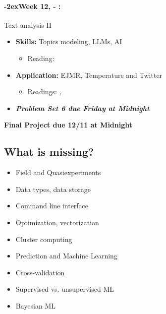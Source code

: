 \documentclass[11pt]{article}
\newcommand{\week}[1]{%
  \paragraph*{\kern-2ex\quad #1, \AdvanceDate[1]\syldate{\today} - \AdvanceDate[2]\syldate{\today}:}%
  \ifdim\wd1=\wd\MONDAY
    \AdvanceDate[7]
  \else
    \AdvanceDate[7]
  \fi%
}
\begin{document}
\week{Week 12} Text analysis II
\begin{itemize}
  \item \textbf{Skills:} Topics modeling, LLMs, AI
  \begin{itemize}
    \item Reading: \textbf{\cite{ash2023textalgorithms}}
  \end{itemize}
  \item \textbf{Application:} EJMR, Temperature and Twitter
  \begin{itemize}
    \item Readings: \textbf{\cite{wu2018gendered}}, \cite{moore2019temp}
  \end{itemize}
  \item \textit{\textbf{Problem Set 6 due Friday at Midnight}}
\end{itemize}

\textbf{Final Project due 12/11 at Midnight}

\subsection*{What is missing?}

\begin{itemize}
  \item Field and Quasiexperiments
  \item Data types, data storage
  \item Command line interface
  \item Optimization, vectorization
  \item Cluster computing
  \item Prediction and Machine Learning
  \item Cross-validation
  \item Supervised vs. unsupervised ML
  \item Bayesian ML
\end{itemize}

\newpage

%



\end{document}
